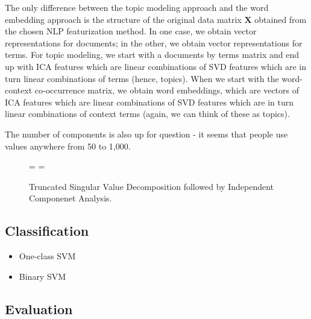 \documentclass{article}
\begin{document}
The only difference between the topic modeling approach and the word
embedding approach is the structure of the original data matrix
\(\mathbf{X}\) obtained from the chosen NLP featurization method. In one
case, we obtain vector representations for documents; in the other, we
obtain vector representations for terms. For topic modeling, we start
with a documents by terms matrix and end up with ICA features which are
linear combinations of SVD features which are in turn linear
combinations of terms (hence, topics). When we start with the
word-context co-occurrence matrix, we obtain word embeddings, which are
vectors of ICA features which are linear combinations of SVD features
which are in turn linear combinations of context terms (again, we can
think of these as topics).

The number of components is also up for question - it seems that people
use values anywhere from 50 to 1,000.

\begin{figure}
  \centering
   = 
   
  \newline
  \newline
  \newline
   = 
   
  \caption{Truncated Singular Value Decomposition followed by Independent Componenet Analysis.}
  \label{fig:matdec}
\end{figure}

\hypertarget{classification}{%
\subsection{Classification}\label{classification}}

\begin{itemize}
\tightlist
\item
  One-class SVM
\item
  Binary SVM
\end{itemize}

\hypertarget{evaluation}{%
\subsection{Evaluation}\label{evaluation}}
\end{document}
